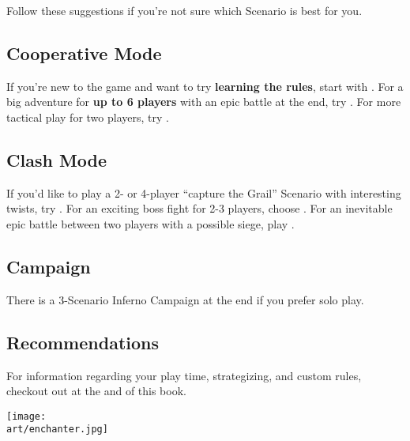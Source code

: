 
\begin{multicols}{2}

Follow these suggestions if you're not sure which Scenario is best for you.

\subsection*{Cooperative Mode}

If you're new to the game and want to try \textbf{learning the rules}, start with .
For a big adventure for \textbf{up to 6 players} with an epic battle at the end, try .
For more tactical play for two players, try .

\subsection*{Clash Mode}

If you'd like to play a 2- or 4-player ``capture the Grail'' Scenario with interesting twists, try .
For an exciting boss fight for 2-3 players, choose .
For an inevitable epic battle between two players with a possible siege, play .

\subsection*{Campaign}

There is a 3-Scenario Inferno  Campaign at the end if you prefer solo play.

\subsection*{Recommendations}

For information regarding your play time, strategizing, and custom rules, checkout out  at the and of this book.

\end{multicols}

\texttt{[image: \\art/enchanter.jpg]}

\vspace*{-1em}
